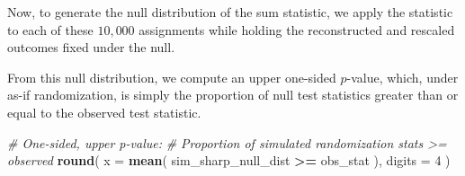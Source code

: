 \documentclass[
  12pt,
  leqno]{article}
\newenvironment{Shaded}{\begin{snugshade}}{\end{snugshade}}
\newcommand{\AttributeTok}[1]{\textcolor[rgb]{0.13,0.29,0.53}{#1}}
\newcommand{\CommentTok}[1]{\textcolor[rgb]{0.56,0.35,0.01}{\textit{#1}}}
\newcommand{\ControlFlowTok}[1]{\textcolor[rgb]{0.13,0.29,0.53}{\textbf{#1}}}
\newcommand{\DecValTok}[1]{\textcolor[rgb]{0.00,0.00,0.81}{#1}}
\newcommand{\FunctionTok}[1]{\textcolor[rgb]{0.13,0.29,0.53}{\textbf{#1}}}
\newcommand{\NormalTok}[1]{#1}
\newcommand{\OtherTok}[1]{\textcolor[rgb]{0.56,0.35,0.01}{#1}}
\newcommand{\SpecialCharTok}[1]{\textcolor[rgb]{0.81,0.36,0.00}{\textbf{#1}}}
\begin{document}
\doublespacing

Now, to generate the null distribution of the sum statistic, we apply
the statistic to each of these \(10{,}000\) assignments while holding
the reconstructed and rescaled outcomes fixed under the null.

\singlespacing

\begin{Shaded}
\end{Shaded}

\doublespacing

From this null distribution, we compute an upper one-sided \(p\)-value,
which, under as-if randomization, is simply the proportion of null test
statistics greater than or equal to the observed test statistic.

\singlespacing

\begin{Shaded}
\begin{Highlighting}[]
\CommentTok{\# One{-}sided, upper p{-}value:}
\CommentTok{\# Proportion of simulated randomization stats \textgreater{}= observed}
\FunctionTok{round}\NormalTok{(}
  \AttributeTok{x =} \FunctionTok{mean}\NormalTok{(}
\NormalTok{    sim\_sharp\_null\_dist }\SpecialCharTok{\textgreater{}=}\NormalTok{ obs\_stat}
\NormalTok{  ),}
  \AttributeTok{digits =} \DecValTok{4}
\NormalTok{)}
\end{Highlighting}
\end{Shaded}
\end{document}
